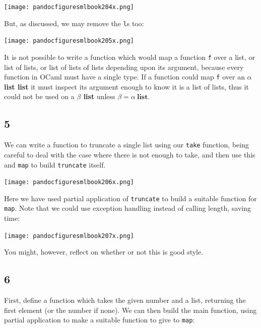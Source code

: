 \documentclass[]{book}
\begin{document}
\medskip
\begin{center}
\noindent\texttt{[image: pandocfiguresmlbook204x.png]}
\end{center}
\medskip

\noindent But, as discussed, we may remove the \texttt{l}s too:

\medskip
\begin{center}
\noindent\texttt{[image: pandocfiguresmlbook205x.png]}
\end{center}
\medskip

\noindent It is not possible to write a function which would map a function \texttt{f} over a list, or list of lists, or list of lists of lists depending upon its argument, because every function in OCaml must have a single type. If a function could map \texttt{f} over an \textsf{\textbf{$\alpha$ list list}} it must inspect its argument enough to know it is a list of lists, thus it could not be used on a \textbf{$\beta$ list} unless \textbf{$\beta = \alpha\  \textbf{list}$}.

\subsection*{5}
We can write a function to truncate a single list using our \texttt{take} function, being careful to deal with the case where there is not enough to take, and then use this and \texttt{map} to build \texttt{truncate} itself.

\medskip
\begin{center}
\noindent\texttt{[image: pandocfiguresmlbook206x.png]}
\end{center}
\medskip

\noindent Here we have used partial application of \texttt{truncate} to build a suitable function for \texttt{map}. Note that we could use exception handling instead of calling length, saving time:

\medskip
\begin{center}
\noindent\texttt{[image: pandocfiguresmlbook207x.png]}
\end{center}
\medskip

\noindent You might, however, reflect on whether or not this is good style.

\subsection*{6}
First, define a function which takes the given number and a list, returning the first element (or the number if none). We can then build the main function, using partial application to make a suitable function to give to \texttt{map}:
\end{document}
